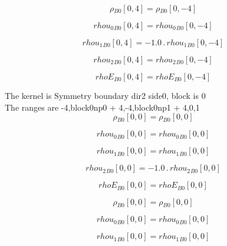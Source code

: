 \documentclass{article}
\begin{document}
\begin{dmath}{\rho{_{B0}}}[{0,4}] = {\rho{_{B0}}}[{0,-4}]\end{dmath}

\begin{dmath}{rhou_{0}{_{B0}}}[{0,4}] = {rhou_{0}{_{B0}}}[{0,-4}]\end{dmath}

\begin{dmath}{rhou_{1}{_{B0}}}[{0,4}] = - 1.0 \,.\, {rhou_{1}{_{B0}}}[{0,-4}]\end{dmath}

\begin{dmath}{rhou_{2}{_{B0}}}[{0,4}] = {rhou_{2}{_{B0}}}[{0,-4}]\end{dmath}

\begin{dmath}{rhoE{_{B0}}}[{0,4}] = {rhoE{_{B0}}}[{0,-4}]\end{dmath}

\noindent The kernel is Symmetry boundary dir2 side0, block is 0\\\noindent The ranges are -4,block0np0 + 4,-4,block0np1 + 4,0,1\\\begin{dmath}{\rho{_{B0}}}[{0,0}] = {\rho{_{B0}}}[{0,0}]\end{dmath}

\begin{dmath}{rhou_{0}{_{B0}}}[{0,0}] = {rhou_{0}{_{B0}}}[{0,0}]\end{dmath}

\begin{dmath}{rhou_{1}{_{B0}}}[{0,0}] = {rhou_{1}{_{B0}}}[{0,0}]\end{dmath}

\begin{dmath}{rhou_{2}{_{B0}}}[{0,0}] = - 1.0 \,.\, {rhou_{2}{_{B0}}}[{0,0}]\end{dmath}

\begin{dmath}{rhoE{_{B0}}}[{0,0}] = {rhoE{_{B0}}}[{0,0}]\end{dmath}

\begin{dmath}{\rho{_{B0}}}[{0,0}] = {\rho{_{B0}}}[{0,0}]\end{dmath}

\begin{dmath}{rhou_{0}{_{B0}}}[{0,0}] = {rhou_{0}{_{B0}}}[{0,0}]\end{dmath}

\begin{dmath}{rhou_{1}{_{B0}}}[{0,0}] = {rhou_{1}{_{B0}}}[{0,0}]\end{dmath}
\end{document}
